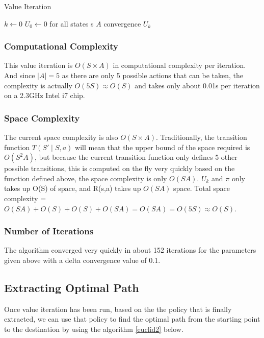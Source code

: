 \documentclass[10pt,twocolumn,letterpaper]{article}
\begin{document}
\begin{algorithm}
\footnotesize
\caption{Value Iteration}\label{euclid}
\begin{algorithmic}[1]
\State $k \gets 0$
\State $U_0 \gets 0$ for all states s
\State $A$
\Repeat 
{}
\EndFor
\Until convergence
\State \Return $U_k$
\EndFunction
\end{algorithmic}
\end{algorithm}

\subsubsection{Computational Complexity}
This value iteration is $O(S \times A)$ in computational complexity per iteration. And since $|A| = 5$ as there are only 5 possible actions that can be taken, the complexity is actually $O(5 S) \approx O(S)$ and takes only about 0.01s per iteration on a 2.3GHz Intel i7 chip. 

\subsubsection{Space Complexity}
The current space complexity is also $O(S \times A)$. Traditionally, the transition function $T(S'\mid S,a)$ will mean that the upper bound of the space required is $O(S^2 A)$, but because the current transition function only defines 5 other possible transitions, this is computed on the fly very quickly based on the function defined above, the space complexity is only $O(S A)$. $U_k$ and $\pi$ only takes up O(S) of space, and R(s,a) takes up $O(S A)$ space. Total space complexity = $O(S A) + O(S) + O(S) + O(S A) = O(S A) = O(5 S) \approx O(S)$.

\subsubsection{Number of Iterations}
The algorithm converged very quickly in about 152 iterations for the parameters given above with a delta convergence value of 0.1.

\subsection{Extracting Optimal Path}
Once value iteration has been run, based on the the policy that is finally extracted, we can use that policy to find the optimal path from the starting point to the destination by using the algorithm \ref{euclid2} below.
\end{document}
